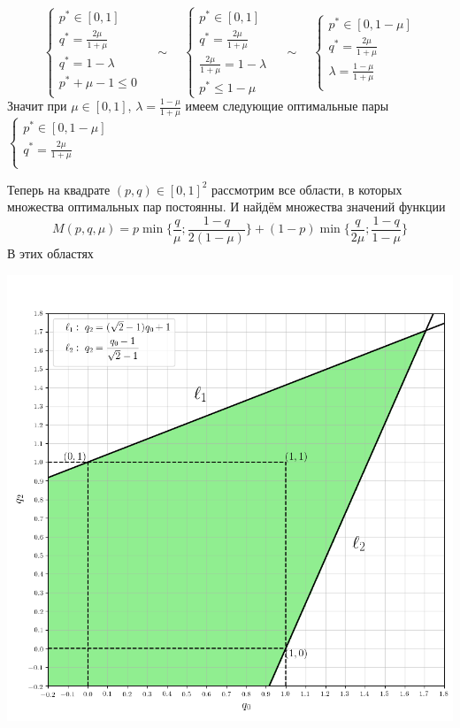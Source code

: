 \documentclass[letterpaper,12pt, reqno]{article}
\newcommand*\circled[1]{\tikz[baseline=(char.base)]{
            \node[shape=circle,draw,inner sep=2pt] (char) {#1};}}
\begin{document}
\begin{flushleft}
\circled{6}%
\[
\begin{cases}
p^{*} \in [0, 1] \\
q^{*}=\frac{2\mu}{1+\mu} \\
q^{*}=1-\lambda \\
p^{*}+\mu-1 \leq 0 \\
\end{cases}
\quad\sim\quad
\begin{cases}
p^{*} \in [0, 1] \\
q^{*}=\frac{2\mu}{1+\mu} \\
\frac{2\mu}{1+\mu}=1-\lambda \\
p^{*} \leq 1 - \mu 
\end{cases}
\quad\sim\quad
\begin{cases}
p^{*} \in [0, 1-\mu] \\
q^{*}=\frac{2\mu}{1+\mu} \\
\lambda = \frac{1-\mu}{1+\mu} \\
\end{cases}
\]
Значит при $\mu \in [0, 1]$, $\lambda = \frac{1-\mu}{1+\mu} $ имеем следующие оптимальные пары
$\begin{cases}
p^{*} \in [0, 1-\mu] \\
q^{*}=\frac{2\mu}{1+\mu} \\
\end{cases}$
\vspace{10mm}

Теперь на квадрате $(p,q)\in[0, 1]^{2}$ рассмотрим все области, в которых множества оптимальных пар постоянны. И найдём множества значений функции 
\[
M(p,q,\mu)=p\min{\{\frac{q}{\mu};\frac{1-q}{2(1-\mu)}\}}+(1-p)\min\{\frac{q}{2\mu};\frac{1-q}{1-\mu}\}
\]
В этих областях

\begin{center}
\includegraphics[scale=0.4]{graf_3_1}
\end{center}


\end{flushleft}
\end{document}

